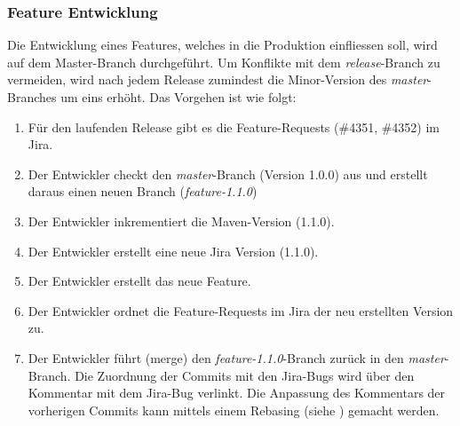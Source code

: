\subsubsection{Feature Entwicklung}
Die Entwicklung eines Features, welches in die Produktion einfliessen soll, wird auf dem Master-Branch durchgeführt. Um Konflikte mit dem \textit{release}-Branch zu vermeiden, wird nach jedem Release zumindest die Minor-Version des \textit{master}-Branches um eins erhöht.  Das Vorgehen ist wie folgt:
\begin{enumerate}
\item Für den laufenden Release gibt es die Feature-Requests (\#4351, \#4352) im Jira.
\item Der Entwickler checkt den \textit{master}-Branch (Version 1.0.0) aus und erstellt daraus einen neuen Branch (\textit{feature-1.1.0})
\item Der Entwickler inkrementiert die Maven-Version (1.1.0).
\item Der Entwickler erstellt eine neue Jira Version (1.1.0).
\item Der Entwickler erstellt das neue Feature.
\item Der Entwickler ordnet die Feature-Requests im Jira der neu erstellten Version zu.
\item Der Entwickler führt (merge) den \textit{feature-1.1.0}-Branch zurück in den \textit{master}-Branch.  Die Zuordnung der Commits mit den Jira-Bugs wird über den Kommentar mit dem Jira-Bug verlinkt. Die Anpassung des Kommentars der vorherigen Commits kann mittels einem Rebasing (siehe \cite{dilger201111}) gemacht werden.
\end{enumerate}